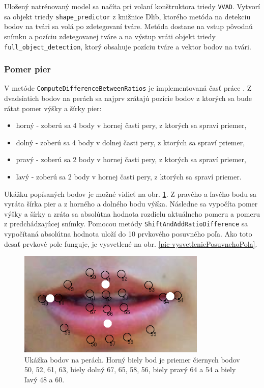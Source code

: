 Uložený natrénovaný model sa načíta pri volaní konštruktora triedy \texttt{VVAD}.
Vytvorí sa objekt triedy \texttt{shape\_predictor} z knižnice Dlib, ktorého metóda na detekciu bodov na tvári sa volá po zdetegovaní tváre.
Metóda dostane na vstup pôvodnú snímku a pozíciu zdetegovanej tváre a na výstup vráti objekt triedy \texttt{full\_object\_detection}, ktorý obsahuje pozíciu tváre a vektor bodov na tvári.

\subsubsection{Pomer pier}\label{pomerPier}
V metóde \texttt{ComputeDifferenceBetweenRatios} je implementovaná časť práce \cite{aoki2007voice}.
Z dvadsiatich bodov na perách sa najprv zrátajú pozície bodov z ktorých sa bude rátat pomer výšky a šírky pier:
\begin{itemize}
\item horný - zoberú sa 4 body v hornej časti pery, z ktorých sa spraví priemer,
\item dolný - zoberú sa 4 body v dolnej časti pery, z ktorých sa spraví priemer,
\item pravý - zoberú sa 2 body v hornej časti pery, z ktorých sa spraví priemer,
\item ľavý - zoberú sa 2 body v hornej časti pery, z ktorých sa spraví priemer.
\end{itemize} 
Ukážku popísaných bodov je možné vidieť na obr. \ref{pic-bodyPomeru}.
Z pravého a ľavého bodu sa vyráta šírka pier a z horného a dolného bodu výška.
Následne sa vypočíta pomer výšky a šírky a zráta sa absolútna hodnota rozdielu aktuálneho pomeru a pomeru z predchádzajúcej snímky. 
Pomocou metódy \texttt{ShiftAndAddRatioDifference} sa vypočítaná absolútna hodnota uloží do 10 prvkového posuvného poľa.
Ako toto desať prvkové pole funguje, je vysvetlené na obr. \ref{pic-vysvetleniePosuvnehoPola}.

\begin{figure}[H]
	\begin{center}
		\includegraphics[height=5cm]{pics/peryBodyUpravene.png}
		\caption{Ukážka bodov na perách. Horný biely bod je priemer čiernych bodov 50, 52, 61, 63, biely dolný 67, 65, 58, 56, biely pravý 64 a 54 a biely ľavý 48 a 60.}
		\label{pic-bodyPomeru}
	\end{center}
\end{figure}

